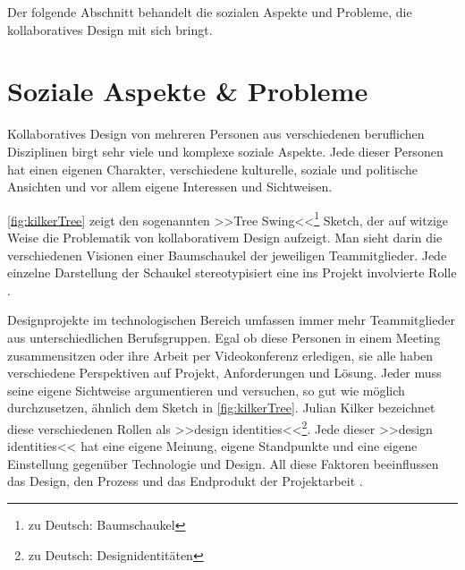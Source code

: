 Der folgende Abschnitt behandelt die sozialen Aspekte und Probleme, die kollaboratives Design mit sich bringt.

\section{Soziale Aspekte \& Probleme} 

Kollaboratives Design von mehreren Personen aus verschiedenen beruflichen Disziplinen birgt sehr viele und komplexe soziale Aspekte. Jede dieser Personen hat einen eigenen Charakter, verschiedene kulturelle, soziale und politische Ansichten und vor allem eigene Interessen und Sichtweisen.

\autoref{fig:kilkerTree} zeigt den sogenannten >>Tree Swing<<\footnote{zu Deutsch: Baumschaukel} Sketch, der auf witzige Weise die Problematik von kollaborativem Design aufzeigt. Man sieht darin die verschiedenen Visionen einer Baumschaukel der jeweiligen Teammitglieder. Jede einzelne Darstellung der Schaukel stereotypisiert eine ins Projekt involvierte Rolle \citep{Kilker:1999}.

\medskip Designprojekte im technologischen Bereich umfassen immer mehr Teammitglieder aus unterschiedlichen Berufsgruppen. Egal ob diese Personen in einem Meeting zusammensitzen oder ihre Arbeit per Videokonferenz erledigen, sie alle haben verschiedene Perspektiven auf Projekt, Anforderungen und Lösung. Jeder muss seine eigene Sichtweise argumentieren und versuchen, so gut wie möglich durchzusetzen, ähnlich dem Sketch in \autoref{fig:kilkerTree}. Julian Kilker bezeichnet diese verschiedenen Rollen als >>design identities<<\footnote{zu Deutsch: Designidentitäten}. Jede dieser >>design identities<< hat eine eigene Meinung, eigene Standpunkte und eine eigene Einstellung gegenüber Technologie und Design. All diese Faktoren beeinflussen das Design, den Prozess und das Endprodukt der Projektarbeit \citep{Kilker:1999}.

